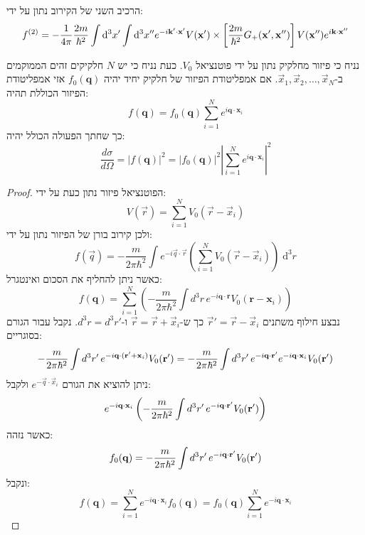\documentclass{tstextbook}
\begin{document}
\begin{proposition}
הרכיב השני של הקירוב נתון על ידי:
$$f^{(2)}=-\frac{1}{4\pi}\frac{2m}{\hbar^{2}}\int \mathrm{d}^3x^{\prime}\int \mathrm{d}^3x^{\prime\prime}e^{-i{\bf k^{\prime}}\cdot{\bf x^{\prime}}}V({\bf x^{\prime}})\times\left[\frac{2m}{\hbar^{2}}G_{+}({\bf x^{\prime},x^{\prime\prime}})\right]V({\bf x^{\prime\prime}})e^{i{\bf k\cdot x^{\prime\prime}}}$$

\end{proposition}
\begin{proposition}
נניח כי פיזור מחלקיק נתון על ידי פוטנציאל \(V_{0}\). כעת נניח כי יש \(N\) חלקיקים זהים הממוקמים ב-\(\vec{x}_{1},\vec{x}_{2},\dots,\vec{x}_{N}\). אם אמפליטודת הפיזור של חלקיק יחיד יהיה \(f_{0}\left( \mathbf{q} \right)\) אזי אמפליטודת הפיזור הכוללת תהיה:
$$f(\mathbf{q})=f_{0}(\mathbf{q})\sum_{i=1}^{N}e^{i\mathbf{q}\cdot\mathbf{x}_{i}}$$
כך שחתך הפעולה הכולל יהיה:
$${\frac{d\sigma}{d\Omega}}=|f(\mathbf{q})|^{2}=|f_{0}(\mathbf{q})|^{2}\left|\sum_{i=1}^{N}e^{i\mathbf{q}\cdot\mathbf{x}_{i}}\right|^{2}$$

\end{proposition}
\begin{proof}
הפוטנציאל פיזור נתון כעת על ידי:
$$V\left( \vec{r} \right)=\sum_{i=1}^{N}V_{0}\left( \vec{r}-\vec{x}_{i} \right)$$
ולכן קירוב בורן של הפיזור נתון על ידי:
$$f\left( \vec{q} \right)=-\frac{m}{2\pi \hbar^{2}}\int e^{-i\vec{q}\cdot \vec{r}}\left( \sum_{i=1}^{N}V_{0}\left( \vec{r}-\vec{x}_{i} \right) \right) \;\mathrm{d} ^{3}r$$
כאשר ניתן להחליף את הסכום ואינטגרל:
$$f(\mathbf{q})=\sum_{i=1}^{N}\left(-{\frac{m}{2\pi\hbar^{2}}}\int d^{3}r\,e^{-i\mathbf{q}\cdot\mathbf{r}}V_{0}(\mathbf{r}-\mathbf{x}_{i})\right)$$
נבצע חילוף משתנים \(\vec{r}'=\vec{r}-\vec{x}_{i}\) כך ש-\(\vec{r}=\vec{r}+\vec{x}_{i}\) ו-\(d^{3}{r}=d^{3}r'\). נקבל עבור הגורם בסוגריים:
$$-{\frac{m}{2\pi\hbar^{2}}}\int d^{3}r^{\prime}\,e^{-i{\bf q}\cdot({\bf r}^{\prime}+{\bf x}_{i})}{ V}_{0}({\bf r}^{\prime})=-{\frac{m}{2\pi\hbar^{2}}}\int d^{3}r^{\prime}\,e^{-i{\bf q}\cdot{\bf r}^{\prime}}e^{-i{\bf q}\cdot{\bf x}_{i}}V_{0}({\bf r}^{\prime})$$
ניתן להוציא את הגורם \(e^{ -\vec{q}\cdot \vec{x}_{i} }\) ולקבל:
$$e^{-i{\bf q}\cdot{\bf x}_{i}}\left(-{\frac{m}{2\pi\hbar^{2}}}\int d^{3}r^{\prime}\,e^{-i{\bf q}\cdot{\bf r^{\prime}}}V_{0}({\bf r^{\prime}})\right)$$
כאשר נזהה:
$$f_{0}({\bf q})=-{\frac{m}{2\pi\hbar^{2}}}\int d^{3}r^{\prime}\,e^{-i{\bf q}\cdot{\bf r^{\prime}}}V_{0}({\bf r^{\prime}})$$
ונקבל:
$$f(\mathbf{q})=\sum_{i=1}^{N}e^{-i\mathbf{q}\cdot\mathbf{x}_{i}}f_{0}(\mathbf{q})=f_{0}(\mathbf{q})\sum_{i=1}^{N}e^{-i\mathbf{q}\cdot\mathbf{x}_{i}}$$

\end{proof}
\end{document}
